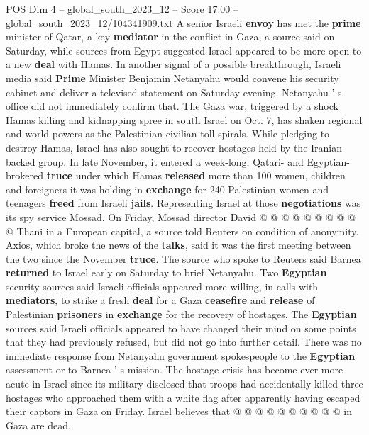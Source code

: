 \begin{textsample}{POS Dim 4 – global\_south\_2023\_12 – Score 17.00 – global\_south\_2023\_12/104341909.txt}  \label{ex:f4_pos_137}
A senior Israeli \textbf{envoy} has met the \textbf{prime} minister of Qatar, a key \textbf{mediator} in the conflict in Gaza, a source said on Saturday, while sources from Egypt suggested Israel appeared to be more open to a new \textbf{deal} with Hamas.
In another signal of a possible breakthrough, Israeli media said \textbf{Prime} Minister Benjamin Netanyahu would convene his security cabinet and deliver a televised statement on Saturday evening.
Netanyahu ' s office did not immediately confirm that.
The Gaza war, triggered by a shock Hamas killing and kidnapping spree in south Israel on Oct. 7, has shaken regional and world powers as the Palestinian civilian toll spirals.
While pledging to destroy Hamas, Israel has also sought to recover hostages held by the Iranian-backed group.
In late November, it entered a week-long, Qatari- and Egyptian-brokered \textbf{truce} under which Hamas \textbf{released} more than 100 women, children and foreigners it was holding in \textbf{exchange} for 240 Palestinian women and teenagers \textbf{freed} from Israeli \textbf{jails}.
Representing Israel at those \textbf{negotiations} was its spy service Mossad.
On Friday, Mossad director David @ @ @ @ @ @ @ @ @ @ Thani in a European capital, a source told Reuters on condition of anonymity.
Axios, which broke the news of the \textbf{talks}, said it was the first meeting between the two since the November \textbf{truce}.
The source who spoke to Reuters said Barnea \textbf{returned} to Israel early on Saturday to brief Netanyahu.
Two \textbf{Egyptian} security sources said Israeli officials appeared more willing, in calls with \textbf{mediators}, to strike a fresh \textbf{deal} for a Gaza \textbf{ceasefire} and \textbf{release} of Palestinian \textbf{prisoners} in \textbf{exchange} for the recovery of hostages.
The \textbf{Egyptian} sources said Israeli officials appeared to have changed their mind on some points that they had previously refused, but did not go into further detail.
There was no immediate response from Netanyahu government spokespeople to the \textbf{Egyptian} assessment or to Barnea ' s mission.
The hostage crisis has become ever-more acute in Israel since its military disclosed that troops had accidentally killed three hostages who approached them with a white flag after apparently having escaped their captors in Gaza on Friday.
Israel believes that @ @ @ @ @ @ @ @ @ @ in Gaza are dead.

\end{textsample}
